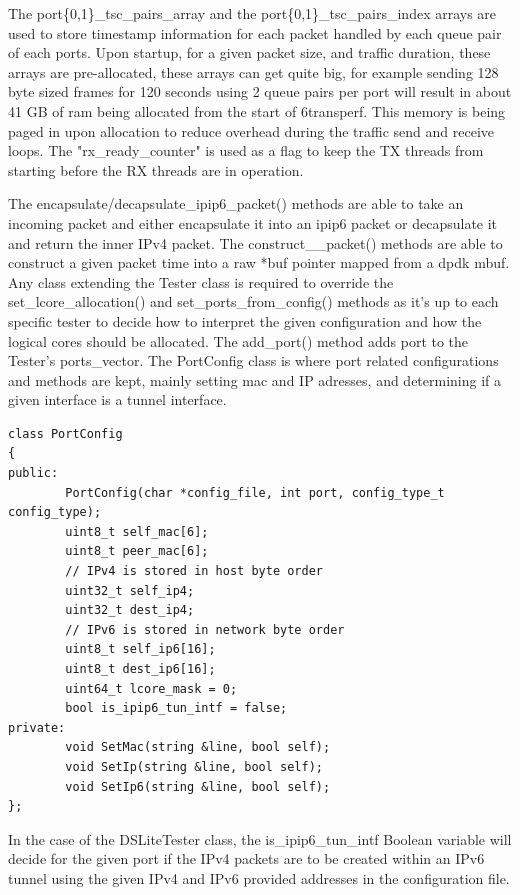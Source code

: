 \documentclass[a4paper,12p,titlepage]{article}
\begin{document}
The port\{0,1\}\_tsc\_pairs\_array and the port\{0,1\}\_tsc\_pairs\_index arrays are used to store timestamp information for each packet handled by each queue pair of each ports. Upon startup, for a given packet size, and traffic duration, these arrays are pre-allocated, these arrays can get quite big, for example sending 128 byte sized frames for 120 seconds using 2 queue pairs per port will result in about 41 GB of ram being allocated from the start of 6transperf. This memory is being paged in upon allocation to reduce overhead during the traffic send and receive loops.
The "rx\_ready\_counter" is used as a flag to keep the TX threads from starting before the RX threads are in operation.

The encapsulate/decapsulate\_ipip6\_packet() methods are able to take an incoming packet and either encapsulate it into an ipip6 packet or decapsulate it and return the inner IPv4 packet.
The construct\_\*\_packet() methods are able to construct a given packet time into a raw *buf pointer mapped from a dpdk mbuf.
Any class extending the Tester class is required to override the set\_lcore\_allocation() and set\_ports\_from\_config() methods as it’s up to each specific tester to decide how to interpret the given configuration and how the logical cores should be allocated.
The add\_port() method adds port to the Tester’s ports\_vector.
The PortConfig class is where port related configurations and methods are kept, mainly setting mac and IP adresses, and determining if a given interface is a tunnel interface.

\begin{frame}

\lstset{language=C++,breaklines=true,numbers=left}
\begin{lstlisting}
class PortConfig
{
public:
        PortConfig(char *config_file, int port, config_type_t config_type);
        uint8_t self_mac[6];
        uint8_t peer_mac[6];
        // IPv4 is stored in host byte order
        uint32_t self_ip4;
        uint32_t dest_ip4;
        // IPv6 is stored in network byte order
        uint8_t self_ip6[16];
        uint8_t dest_ip6[16];
        uint64_t lcore_mask = 0;
        bool is_ipip6_tun_intf = false;
private:
        void SetMac(string &line, bool self);
        void SetIp(string &line, bool self);
        void SetIp6(string &line, bool self);
};
\end{lstlisting}
\end{frame}

In the case of the DSLiteTester class, the is\_ipip6\_tun\_intf Boolean variable will decide for the given port if the IPv4 packets are to be created within an IPv6 tunnel using the given IPv4 and IPv6 provided addresses in the configuration file.
\end{document}
